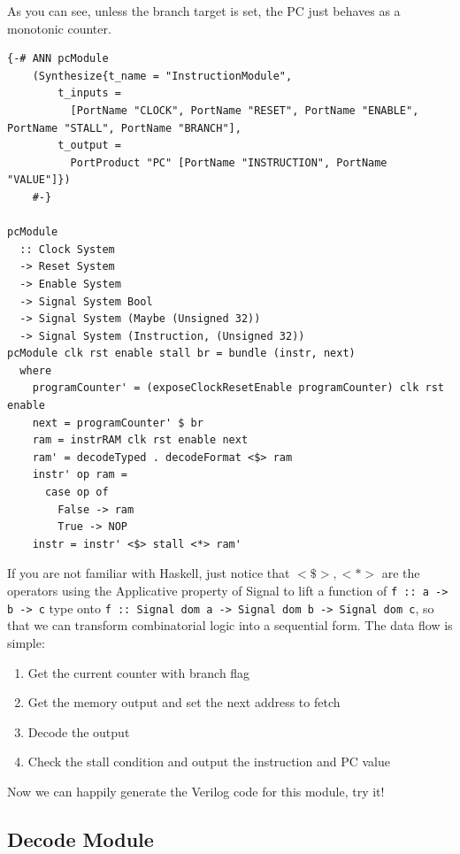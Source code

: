 \documentclass[a4paper,12pt, oneside]{book}
\begin{document}
As you can see, unless the branch target is set, the PC just behaves as a monotonic counter.
\begin{verbatim}
{-# ANN pcModule
    (Synthesize{t_name = "InstructionModule",
        t_inputs =
          [PortName "CLOCK", PortName "RESET", PortName "ENABLE", PortName "STALL", PortName "BRANCH"],
        t_output =
          PortProduct "PC" [PortName "INSTRUCTION", PortName "VALUE"]})
    #-}

pcModule 
  :: Clock System
  -> Reset System
  -> Enable System
  -> Signal System Bool
  -> Signal System (Maybe (Unsigned 32))
  -> Signal System (Instruction, (Unsigned 32))
pcModule clk rst enable stall br = bundle (instr, next)
  where
    programCounter' = (exposeClockResetEnable programCounter) clk rst enable
    next = programCounter' $ br
    ram = instrRAM clk rst enable next
    ram' = decodeTyped . decodeFormat <$> ram
    instr' op ram =
      case op of
        False -> ram
        True -> NOP
    instr = instr' <$> stall <*> ram'
\end{verbatim}
If you are not familiar with Haskell, just notice that $<\$>, <*>$ are the operators using the Applicative property of Signal to lift a function of \texttt{f :: a -> b -> c} type onto \texttt{f :: Signal dom a -> Signal dom b -> Signal dom c}, so that we can transform combinatorial logic into a sequential form.
The data flow is simple:
\begin{enumerate}
	\item Get the current counter with branch flag
	\item Get the memory output and set the next address to fetch
	\item Decode the output
	\item Check the stall condition and output the instruction and PC value
\end{enumerate}
Now we can happily generate the Verilog code for this module, try it!

\subsection{Decode Module}
\end{document}
